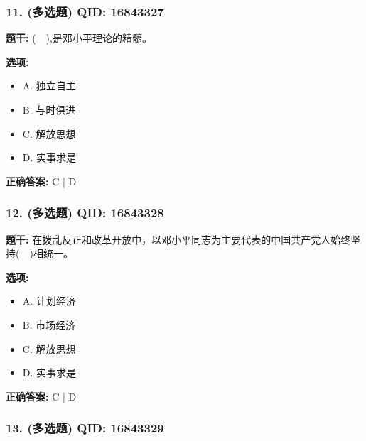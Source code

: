 \documentclass[12pt,UTF8]{ctexart}
\begin{document}
\subsubsection*{11. (多选题) \small QID: 16843327}

\textbf{题干:}
(  ),是邓小平理论的精髓。

\textbf{选项:}
\begin{itemize}[leftmargin=*]

  \item A. 独立自主

  \item B. 与时俱进

  \item C. 解放思想

  \item D. 实事求是

\end{itemize}

\textbf{正确答案:}
C | D

\vspace{0.3em}\hrulefill\vspace{0.7em}

\subsubsection*{12. (多选题) \small QID: 16843328}

\textbf{题干:}
在拨乱反正和改革开放中，以邓小平同志为主要代表的中国共产党人始终坚持(  )相统一。

\textbf{选项:}
\begin{itemize}[leftmargin=*]

  \item A. 计划经济

  \item B. 市场经济

  \item C. 解放思想

  \item D. 实事求是

\end{itemize}

\textbf{正确答案:}
C | D

\vspace{0.3em}\hrulefill\vspace{0.7em}

\subsubsection*{13. (多选题) \small QID: 16843329}
\end{document}
